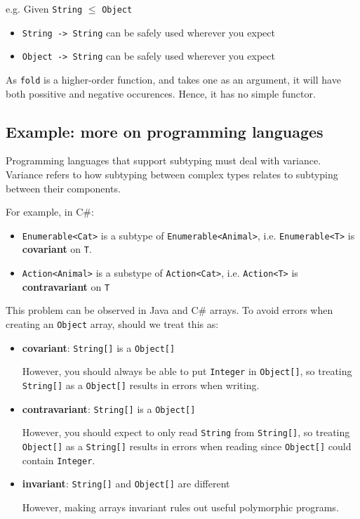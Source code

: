 \documentclass[../main.tex]{subfiles}
\begin{document}
e.g. Given {\tt String} $\leq$ {\tt Object}
\begin{itemize}
\item {\tt String -> String} \quad can be safely used wherever you expect 
\item {\tt Object -> String} \quad can be safely used wherever you expect 
\end{itemize}

As {\tt fold} is a higher-order function, and takes one as an argument, it will have both possitive and negative occurences. Hence, it has no simple functor.

\subsection{Example: more on programming languages}

Programming languages that support subtyping must deal with variance. Variance refers to how subtyping between complex types relates to subtyping between their components.

For example, in C\#:
\begin{itemize}
\item {\tt Enumerable<Cat>} is a subtype of {\tt Enumerable<Animal>}, i.e. {\tt Enumerable<T>} is \textbf{covariant} on {\tt T}.
\item {\tt Action<Animal>} is a substype of {\tt Action<Cat>}, i.e. {\tt Action<T>} is \textbf{contravariant} on {\tt T}
\end{itemize}

This problem can be observed in Java and C\# arrays. To avoid errors when creating an {\tt Object} array, should we treat this as:
\begin{itemize}
\item \textbf{covariant}: {\tt String[]} is a {\tt Object[]}

However, you should always be able to put {\tt Integer} in {\tt Object[]}, so treating {\tt String[]} as a {\tt Object[]} results in errors when writing.

\item \textbf{contravariant}: {\tt String[]} is a {\tt Object[]}

However, you should expect to only read {\tt String} from {\tt String[]}, so treating {\tt Object[]} as a {\tt String[]} results in errors when reading since {\tt Object[]} could contain {\tt Integer}.

\item \textbf{invariant}: {\tt String[]} and {\tt Object[]} are different

However, making arrays invariant rules out useful polymorphic programs.
\end{itemize}
\end{document}
